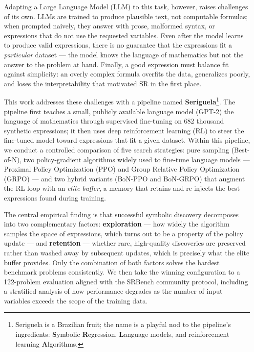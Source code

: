 Adapting a Large Language Model (LLM) to this task, however, raises challenges of its own. LLMs are trained to produce plausible text, not computable formulas; when prompted naively, they answer with prose, malformed syntax, or expressions that do not use the requested variables. Even after the model learns to produce valid expressions, there is no guarantee that the expressions fit a \emph{particular} dataset --- the model knows the language of mathematics but not the answer to the problem at hand. Finally, a good expression must balance fit against simplicity: an overly complex formula overfits the data, generalizes poorly, and loses the interpretability that motivated SR in the first place.

This work addresses these challenges with a pipeline named \textbf{Seriguela}\footnote{Seriguela is a Brazilian fruit; the name is a playful nod to the pipeline's ingredients: \textbf{S}ymbolic \textbf{R}egression, \textbf{L}anguage models, and reinforcement learning \textbf{A}lgorithms.}. The pipeline first teaches a small, publicly available language model (GPT-2) the language of mathematics through supervised fine-tuning on 682 thousand synthetic expressions; it then uses deep reinforcement learning (RL) to steer the fine-tuned model toward expressions that fit a given dataset. Within this pipeline, we conduct a controlled comparison of five search strategies: pure sampling (Best-of-N), two policy-gradient algorithms widely used to fine-tune language models --- Proximal Policy Optimization (PPO) and Group Relative Policy Optimization (GRPO) --- and two hybrid variants (BoN-PPO and BoN-GRPO) that augment the RL loop with an \emph{elite buffer}, a memory that retains and re-injects the best expressions found during training.

The central empirical finding is that successful symbolic discovery decomposes into two complementary factors: \textbf{exploration} --- how widely the algorithm samples the space of expressions, which turns out to be a property of the policy update --- and \textbf{retention} --- whether rare, high-quality discoveries are preserved rather than washed away by subsequent updates, which is precisely what the elite buffer provides. Only the combination of both factors solves the hardest benchmark problems consistently. We then take the winning configuration to a 122-problem evaluation aligned with the SRBench community protocol, including a stratified analysis of how performance degrades as the number of input variables exceeds the scope of the training data.

